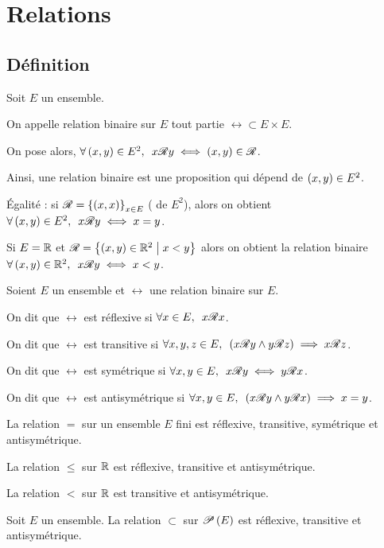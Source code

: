 \section{Relations}

\subsection{Définition}

\begin{defi}
Soit \(E\) un ensemble.

On appelle relation binaire sur \(E\) tout partie \(\rel\subset E\times E\).

On pose alors, \(\quantifs{\forall\paren{x,y}\in E^2}x\rel y\iff\paren{x,y}\in\rel\).

Ainsi, une relation binaire est une proposition qui dépend de \(\paren{x,y}\in E^2\).
\end{defi}

\begin{ex}
Égalité : si \(\rel=\accol{\paren{x,x}}_{x\in E}\) ( de \(E^2\)), alors on obtient \(\quantifs{\forall\paren{x,y}\in E^2}x\rel y\iff x=y\).

Si \(E=\R\) et \(\rel=\accol{\paren{x,y}\in\R^2\tq x<y}\) alors on obtient la relation binaire \(\quantifs{\forall\paren{x,y}\in\R^2}x\rel y\iff x<y\).
\end{ex}

\begin{defi}
Soient \(E\) un ensemble et \(\rel\) une relation binaire sur \(E\).

On dit que \(\rel\) est réflexive si \(\quantifs{\forall x\in E}x\rel x\).

On dit que \(\rel\) est transitive si \(\quantifs{\forall x,y,z\in E}\paren{x\rel y\et y\rel z}\imp x\rel z\).

On dit que \(\rel\) est symétrique si \(\quantifs{\forall x,y\in E}x\rel y\iff y\rel x\).

On dit que \(\rel\) est antisymétrique si \(\quantifs{\forall x,y\in E}\paren{x\rel y\et y\rel x}\imp x=y\).
\end{defi}

\begin{ex}
La relation \(=\) sur un ensemble \(E\) fini est réflexive, transitive, symétrique et antisymétrique.

La relation \(\leq\) sur \(\R\) est réflexive, transitive et antisymétrique.

La relation \(<\) sur \(\R\) est transitive et antisymétrique.

Soit \(E\) un ensemble. La relation \(\subset\) sur \(\P{E}\) est réflexive, transitive et antisymétrique.
\end{ex}


